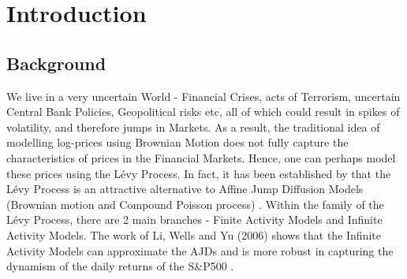 \documentclass[12pt]{article}
\theoremstyle{definition}
\begin{document}
\tableofcontents
\newpage

\section{Introduction}
\subsection{Background}
We live in a very uncertain World - Financial Crises, acts of Terrorism, uncertain Central Bank Policies, Geopolitical risks etc, all of which could result in spikes of volatility, and therefore jumps in Markets. As a result, the traditional idea of modelling log-prices using Brownian Motion does not fully capture the characteristics of prices in the Financial Markets. Hence, one can perhaps model these prices using the L\'{e}vy Process. In fact, it has been established by that the L\'{e}vy Process is an attractive alternative to Affine Jump Diffusion Models (Brownian motion and Compound Poisson process) \cite{carr2004time}.
Within the family of the L\'{e}vy Process, there are 2 main branches - Finite Activity Models and Infinite Activity Models. The work of Li, Wells and Yu (2006) shows that the Infinite Activity Models can approximate the AJDs and is more robust in capturing the dynamism of the daily returns of the S\&P500 \cite{li2008bayesian}.
\end{document}
